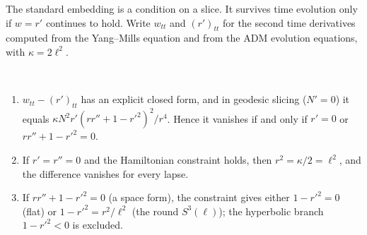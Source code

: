 The standard embedding is a condition on a slice. It survives time evolution only if $w=r'$ continues to hold. Write $w_{tt}$ and $(r')_{tt}$ for the second time derivatives computed from the Yang--Mills equation and from the ADM evolution equations, with $\kappa=2\ell^2$.

\begin{theorem}\label{thm:sector}\ver\
\begin{enumerate}[label=(\roman*)]
\item $w_{tt}-(r')_{tt}$ has an explicit closed form, and in geodesic slicing ($N'=0$) it equals $\kappa N^2r'(rr''+1-r'^2)^2/r^4$. Hence it vanishes if and only if $r'=0$ or $rr''+1-r'^2=0$.
\item If $r'=r''=0$ and the Hamiltonian constraint holds, then $r^2=\kappa/2=\ell^2$, and the difference vanishes for every lapse.
\item If $rr''+1-r'^2=0$ (a space form), the constraint gives either $1-r'^2=0$ (flat) or $1-r'^2=r^2/\ell^2$ (the round $S^3(\ell)$); the hyperbolic branch $1-r'^2<0$ is excluded.
\end{enumerate}
\end{theorem}
